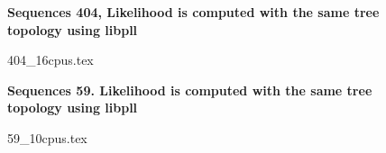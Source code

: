 \documentclass[12pt,a4paper]{article}
\begin{document}
\newcommand*{\figuretitle}[1]{%
    {\centering%
    \textbf{#1}%
    \par\medskip}%
}



\begin{figure}
\figuretitle{Sequences 404, Likelihood is computed with the same tree topology using libpll}
{404_16cpus.tex}
\end{figure}



\begin{figure}
\figuretitle{Sequences 59. Likelihood is computed with the same tree topology using libpll}
{59_10cpus.tex}
\end{figure}
\end{document}
